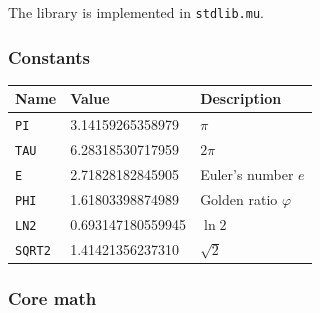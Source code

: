 \documentclass[11pt,a4paper]{article}
\newcommand{\musil}[1]{\lstinline[style=musilinline]{#1}}
\begin{document}
The library is implemented in \musil{stdlib.mu}.

\subsubsection{Constants}

\begin{center}
\begin{tabular}{@{}lll@{}}
\toprule
\textbf{Name} & \textbf{Value} & \textbf{Description} \\
\midrule
\texttt{PI}    & 3.14159265358979 & $\pi$ \\
\texttt{TAU}   & 6.28318530717959 & $2\pi$ \\
\texttt{E}     & 2.71828182845905 & Euler's number $e$ \\
\texttt{PHI}   & 1.61803398874989 & Golden ratio $\varphi$ \\
\texttt{LN2}   & 0.693147180559945 & $\ln 2$ \\
\texttt{SQRT2} & 1.41421356237310 & $\sqrt{2}$ \\
\bottomrule
\end{tabular}
\end{center}

\subsubsection{Core math}
\end{document}
